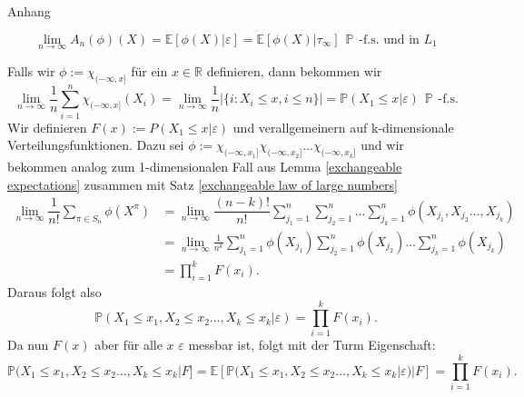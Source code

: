 \begin{section}{Anhang}
\begin{theorem}
\[
\lim_{n \to \infty}A_n(\phi)(X) = \mathbb{E}[\phi(X)|\varepsilon] = \mathbb{E}[\phi(X)|\tau_\infty]\hspace{5pt} \mathbb{P} \hspace{5pt} \text{-f.s. und in } L_1
\] 
\end{theorem}
Falls wir $\phi := \chi_{(-\infty,x]}$ für ein $x \in \mathbb{R}$ definieren, dann bekommen wir 
\[ \lim_{n \to \infty} \frac{1}{n}\sum_{i=1}^{n} \chi_{(-\infty,x]}(X_i) =  \lim_{n \to \infty} \frac{1}{n}|\{i: X_i \leq x, i \leq n\}| = \mathbb{P}(X_1 \leq x |\varepsilon) \hspace{5pt}\mathbb{P}\hspace{5pt} \text{-f.s.}
\]
Wir definieren $F(x):= P(X_1 \leq x | \varepsilon)$ und verallgemeinern auf k-dimensionale Verteilungsfunktionen. Dazu sei $\phi:= \chi_{(-\infty,x_1]}\chi_{(-\infty,x_2]}...\chi_{(-\infty,x_k]}$ und wir bekommen analog zum 1-dimensionalen Fall aus Lemma \ref{exchangeable expectations} zusammen mit Satz \ref{exchangeable law of large numbers}
\begin{align*}
\lim_{n \to \infty} \dfrac{1}{n!}\sum_{\pi \in S_n} \phi(X^\pi) &= \lim_{n \to \infty}\dfrac{(n-k)!}{n!}\sum_{j_1=1}^{n} \sum_{j_2=1}^{n}...\sum_{j_k=1}^{n} \phi(X_{j_1},X_{j_2}...,X_{j_k}) \\
&= \lim_{n \to \infty} \frac{1}{n^k} \sum_{j_1=1}^{n} \phi(X_{j_1})\sum_{j_2=1}^{n} \phi(X_{j_2})...\sum_{j_k=1}^{n} \phi(X_{j_k})\\
&= \prod_{i=1}^{k}F(x_i).
\end{align*}
Daraus folgt also
\[
\mathbb{P}(X_1 \leq x_1, X_2 \leq x_2..., X_k \leq x_k| \varepsilon) = \prod_{i=1}^k F(x_i).
\]
Da nun $F(x)$ aber für alle $x$ $\varepsilon$ messbar ist, folgt mit der Turm Eigenschaft:
\[
\mathbb{P}(X_1 \leq x_1, X_2 \leq x_2..., X_k \leq x_k|F]  
= \mathbb{E}[\mathbb{P}(X_1 \leq x_1, X_2 \leq x_2..., X_k \leq x_k| \varepsilon)|F] = \prod_{i=1}^k F(x_i).
\]

\end{section}